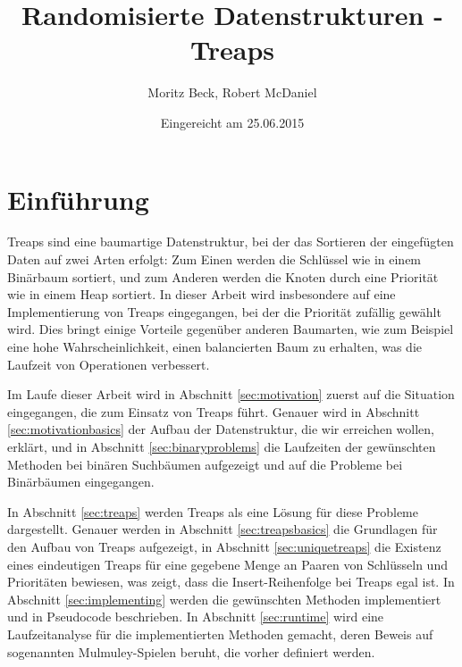 \documentclass[a4paper]{scrreprt}
\theoremstyle{definition}
\begin{document}

\subject{Seminararbeit}
\title{Randomisierte Datenstrukturen - Treaps}
\author{Moritz Beck, Robert McDaniel}
\date{Eingereicht am 25.06.2015}
\titlehead{Julius-Maximilians-Universität Würzburg\\
Institut für Informatik\\
Lehrstuhl für Informatik I\\
Effiziente Algorithmen und wissensbasierte Systeme}
\publishers{Betreuer:\\
Prof.\ Dr.\ Alexander Wolff\\
Dr.\ Philipp Kindermann}
\maketitle
\tableofcontents


\chapter{Einführung}
\label{sec:intro}

Treaps sind eine baumartige Datenstruktur, bei der das Sortieren der eingefügten Daten auf zwei Arten erfolgt:
Zum Einen werden die Schlüssel wie in einem Binärbaum sortiert, und zum Anderen werden die Knoten durch eine Priorität wie in einem Heap sortiert.
In dieser Arbeit wird insbesondere auf eine Implementierung von Treaps eingegangen, bei der die Priorität zufällig gewählt wird.
Dies bringt einige Vorteile gegenüber anderen Baumarten, wie zum Beispiel eine hohe Wahrscheinlichkeit, einen balancierten Baum zu erhalten, was die Laufzeit von Operationen verbessert.

Im Laufe dieser Arbeit wird in Abschnitt \ref{sec:motivation} zuerst auf die Situation eingegangen, die zum Einsatz von Treaps führt.
Genauer wird in Abschnitt \ref{sec:motivationbasics} der Aufbau der Datenstruktur, die wir erreichen wollen, erklärt, und in Abschnitt \ref{sec:binaryproblems} die Laufzeiten der gewünschten Methoden bei binären Suchbäumen aufgezeigt und auf die Probleme bei Binärbäumen eingegangen.

In Abschnitt \ref{sec:treaps} werden Treaps als eine Lösung für diese Probleme dargestellt.
Genauer werden in Abschnitt \ref{sec:treapsbasics} die Grundlagen für den Aufbau von Treaps aufgezeigt, in Abschnitt \ref{sec:uniquetreaps} die Existenz eines eindeutigen Treaps für eine gegebene Menge an Paaren von Schlüsseln und Prioritäten bewiesen, was zeigt, dass die Insert-Reihenfolge bei Treaps egal ist. In Abschnitt \ref{sec:implementing} werden die gewünschten Methoden implementiert und in Pseudocode beschrieben. In Abschnitt \ref{sec:runtime} wird eine Laufzeitanalyse für die implementierten Methoden gemacht, deren Beweis auf sogenannten Mulmuley-Spielen beruht, die vorher definiert werden.
\end{document}
